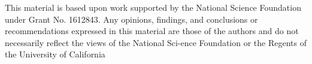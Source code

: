 %
%


This material is based upon work supported by the National Science Foundation under Grant No. 1612843. Any opinions, findings, and conclusions or recommendations expressed in this material are those of the authors and do not necessarily reflect the views of the National Sci-ence Foundation or the Regents of the University of California

